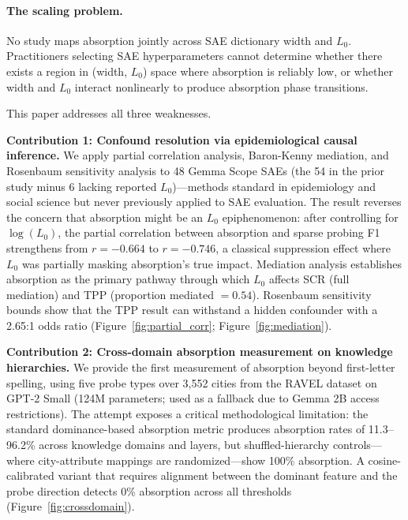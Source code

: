 \documentclass{article}
\begin{document}
\paragraph{The scaling problem.}
No study maps absorption jointly across SAE dictionary width and $L_0$.
Practitioners selecting SAE hyperparameters cannot determine whether there exists a region in (width, $L_0$) space where absorption is reliably low, or whether width and $L_0$ interact nonlinearly to produce absorption phase transitions.

This paper addresses all three weaknesses.

\textbf{Contribution 1: Confound resolution via epidemiological causal inference.}
We apply partial correlation analysis, Baron-Kenny mediation, and Rosenbaum sensitivity analysis to 48 Gemma Scope SAEs (the 54 in the prior study minus 6 lacking reported $L_0$)---methods standard in epidemiology and social science but never previously applied to SAE evaluation.
The result reverses the concern that absorption might be an $L_0$ epiphenomenon: after controlling for $\log(L_0)$, the partial correlation between absorption and sparse probing F1 strengthens from $r = -0.664$ to $r = -0.746$, a classical suppression effect where $L_0$ was partially masking absorption's true impact.
Mediation analysis establishes absorption as the primary pathway through which $L_0$ affects SCR (full mediation) and TPP (proportion mediated $= 0.54$).
Rosenbaum sensitivity bounds show that the TPP result can withstand a hidden confounder with a 2.65:1 odds ratio (Figure~\ref{fig:partial_corr}; Figure~\ref{fig:mediation}).

\textbf{Contribution 2: Cross-domain absorption measurement on knowledge hierarchies.}
We provide the first measurement of absorption beyond first-letter spelling, using five probe types over 3,552 cities from the RAVEL dataset on GPT-2 Small (124M parameters; used as a fallback due to Gemma 2B access restrictions).
The attempt exposes a critical methodological limitation: the standard dominance-based absorption metric \citep{chanin2024absorption} produces absorption rates of 11.3--96.2\% across knowledge domains and layers, but shuffled-hierarchy controls---where city-attribute mappings are randomized---show 100\% absorption.
A cosine-calibrated variant that requires alignment between the dominant feature and the probe direction detects 0\% absorption across all thresholds (Figure~\ref{fig:crossdomain}).
\end{document}
